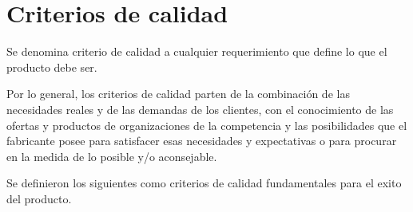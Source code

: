 \section{Criterios de calidad}
Se denomina criterio de calidad a cualquier requerimiento que define lo que el
producto debe ser.

Por lo general, los criterios de calidad parten de la combinación de las
necesidades reales y de las demandas de los clientes, con el conocimiento de las
ofertas y productos de organizaciones de la competencia y las posibilidades que
el fabricante posee para satisfacer esas necesidades y expectativas o para
procurar en la medida de lo posible y/o aconsejable\cite{Haaz}.

Se definieron los siguientes como criterios de calidad fundamentales para el
exito del producto\cite{Fillottrani}.

